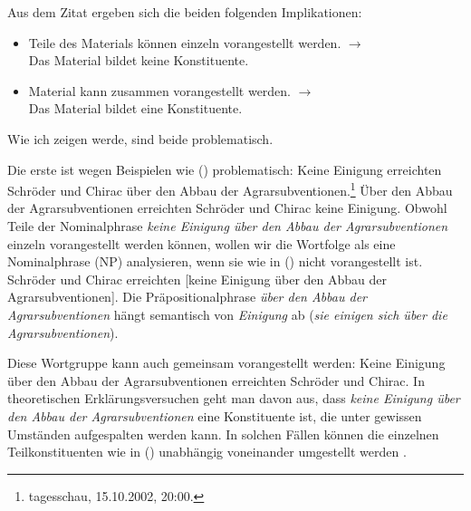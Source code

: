 \documentclass[ number=45
			   ,series=eotms
			   ,printondemand
			  ]{langsci}
\begin{document}
{\noindent
Aus dem Zitat ergeben sich die beiden folgenden Implikationen:
\begin{itemize}
\item Teile des Materials können einzeln vorangestellt werden. $\to$\\
      Das Material bildet keine Konstituente.
\item Material kann zusammen vorangestellt werden. $\to$\\
      Das Material bildet eine Konstituente.
\end{itemize}
Wie ich zeigen werde, sind beide problematisch.

Die erste ist wegen Beispielen wie () problematisch:
\eal
\ex Keine Einigung erreichten Schröder und Chirac über den Abbau der Agrarsubventionen.\footnote{tagesschau, 15.10.2002, 20:00.}
\ex Über den Abbau der Agrarsubventionen erreichten Schröder und Chirac keine Einigung.
\zl
Obwohl Teile der Nominalphrase \emph{keine Einigung über den Abbau der Agrarsubventionen}
einzeln vorangestellt werden können, wollen wir die Wortfolge als eine Nominalphrase (NP) analysieren,
wenn sie wie in () nicht vorangestellt ist.
\ea
Schröder und Chirac erreichten [keine Einigung über den Abbau der Agrarsubventionen].
\z
Die Präpositionalphrase \emph{über den Abbau der Agrarsubventionen} hängt semantisch von \emph{Einigung}
ab (\emph{sie einigen sich über die Agrarsubventionen}).

Diese Wortgruppe kann auch gemeinsam vorangestellt werden:
\ea
Keine Einigung über den Abbau der Agrarsubventionen erreichten Schröder und Chirac.
\z
In theoretischen Erklärungsversuchen geht man davon aus, dass \emph{keine Einigung über den Abbau
  der Agrarsubventionen} eine Konstituente ist, die unter gewissen Umständen
aufgespalten werden kann. In solchen Fällen können die einzelnen
Teilkonstituenten wie in () unabhängig voneinander umgestellt werden \citep{deKuthy2002a}. 



}
\end{document}
